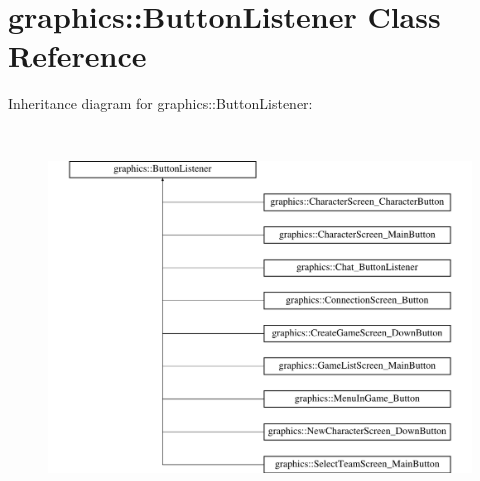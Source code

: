\hypertarget{classgraphics_1_1_button_listener}{\section{graphics\-:\-:Button\-Listener Class Reference}
\label{classgraphics_1_1_button_listener}
}
Inheritance diagram for graphics\-:\-:Button\-Listener\-:\begin{figure}[H]
\begin{center}
\leavevmode
\includegraphics[height=10.000000cm]{classgraphics_1_1_button_listener}
\end{center}
\end{figure}
